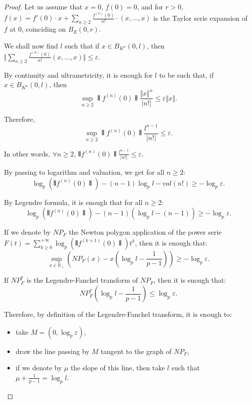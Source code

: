 \documentclass{amsart}
\begin{document}
\begin{proof}
Let us assume that $x=0$, $f(0)=0$, and for $r>0$, $f(x)=f'(0) \cdot x +\sum_{n \geq 2} \frac{f^{(n)}(0)}{n!} \cdot (x, \dots,x)$ is the Taylor serie expansion of $f$ at $0$, coinciding on $B_E (0,r)$.

We shall now find $l$ such that if $x \in B_{K^n}(0,l)$, then $\Vert \sum_{n \geq 2} \frac{f^{(n)}(0)}{n!}(x,\dots,x) \Vert \leq \varepsilon$.

By continuity and ultrametricity, it is enough for $l$ to be such that, if $x \in B_{K^n}(0,l)$, then  \[ \sup_{n \geq 2} \interleave f^{(n)}(0) \interleave \frac{\Vert x \Vert^n }{ \vert n! \vert } \leq \varepsilon \Vert x \Vert .\] 

Therefore, \[ \sup_{n \geq 2} \interleave f^{(n)}(0) \interleave \frac{l^{n-1} }{\vert n! \vert } \leq \varepsilon . \] 

In other words, $\forall n \geq 2$, $\interleave f^{(n)}(0) \interleave \frac{l^{n-1} }{\vert n! \vert } \leq \varepsilon.$

By passing to logarithm and valuation, we get for all $n \geq 2$: \[ \log_p (\interleave f^{(n)}(0) \interleave )-(n-1) \log_p l-val (n!)\geq - \log_p \varepsilon.\]

By Legendre formula, it is enough that for all $n \geq 2$:
\[\log_p (\interleave f^{(n)}(0) \interleave )-(n-1) (\log_p l-(n-1)) \geq - \log_p \varepsilon.\]

If we denote by $NP_F$ the Newton polygon application of the power serie $F(t) = \sum_{k\geq 0}^{+\infty} \log_p (\interleave f^{(k+1)}(0) \interleave ) t^k$, then it is enough that:
\[ \sup_{ x \in \mathbb{R}_+} \left( NP_F(x) -x  \left( \log_p l - \frac{1}{p-1} \right) \right) \geq - \log_p \varepsilon.\]

If $NP_F^*$ is the Legendre-Fanchel transform of $NP_F$, then it is enough that:
\[ NP_F^* \left( \log_p l - \frac{1}{p-1} \right) \leq \log_p \varepsilon.\]

Therefore, by definition of the Legendre-Fanchel transform, it is enough to:
\begin{itemize}
\item take $M=(0,\log_p \varepsilon)$,
\item draw the line passing by $M$ tangent to the graph of $NP_F$,
\item if we denote by $\mu$ the slope of this line, then take $l$ such that $\mu + \frac{1}{p-1}=\log_p l$.
\end{itemize}
\end{proof}
\end{document}
